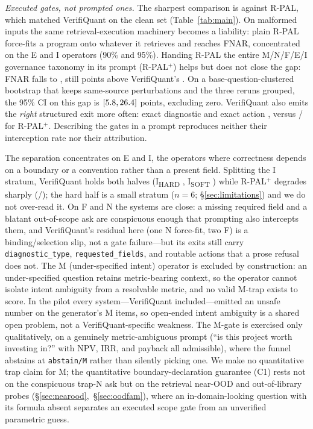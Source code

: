 \emph{Executed gates, not prompted ones.}
The sharpest comparison is against R-PAL, which matched VerifiQuant on the clean set (Table~\ref{tab:main}).
On malformed inputs the same retrieval-execution machinery becomes a liability: plain R-PAL force-fits a program onto whatever it retrieves and reaches \govPlainFnar{} FNAR, concentrated on the E and I operators (90\% and 95\%).
Handing R-PAL the entire M/N/F/E/I governance taxonomy in its prompt (R-PAL$^{+}$) helps but does not close the gap: FNAR falls to \govPromptFnar{}, still \govGap{} points above VerifiQuant's \govVQfnar{}.
On a base-question-clustered bootstrap that keeps same-source perturbations and the three reruns grouped, the 95\% CI on this gap is $[5.8{}, 26.4{}]$ points, excluding zero.
VerifiQuant also emits the \emph{right} structured exit more often: exact diagnostic \govVQdiag{} and exact action \govVQaction{}, versus \govPromptDiag{}/\govPromptAction{} for R-PAL$^{+}$.
Describing the gates in a prompt reproduces neither their interception rate nor their attribution.

The separation concentrates on E and I, the operators where correctness depends on a boundary or a convention rather than a present field.
Splitting the I stratum, VerifiQuant holds both halves (I\textsubscript{HARD} \govVQihard{}, I\textsubscript{SOFT} \govVQisoft{}) while R-PAL$^{+}$ degrades sharply (\govPromptIhard{}/\govPromptIsoft{}); the hard half is a small stratum ($n{=}6$; \S\ref{sec:limitations}) and we do not over-read it.
On F and N the systems are close: a missing required field and a blatant out-of-scope ask are conspicuous enough that prompting also intercepts them, and VerifiQuant's residual here (one N force-fit, two F) is a binding/selection slip, not a gate failure---but its exits still carry \texttt{diagnostic\_type}, \texttt{requested\_fields}, and routable actions that a prose refusal does not.
The M (under-specified intent) operator is excluded by construction: an under-specified question retains metric-bearing context, so the operator cannot isolate intent ambiguity from a resolvable metric, and no valid M-trap exists to score.
In the pilot every system---VerifiQuant included---emitted an unsafe number on the generator's M items, so open-ended intent ambiguity is a shared open problem, not a VerifiQuant-specific weakness.
The M-gate is exercised only qualitatively, on a genuinely metric-ambiguous prompt (``is this project worth investing in?'' with NPV, IRR, and payback all admissible), where the funnel abstains at \texttt{abstain/M} rather than silently picking one.
We make no quantitative trap claim for M; the quantitative boundary-declaration guarantee (C1) rests not on the conspicuous trap-N ask but on the retrieval near-OOD and out-of-library probes (\S\ref{sec:nearood},~\S\ref{sec:oodfam}), where an in-domain-looking question with its formula absent separates an executed scope gate from an unverified parametric guess.


